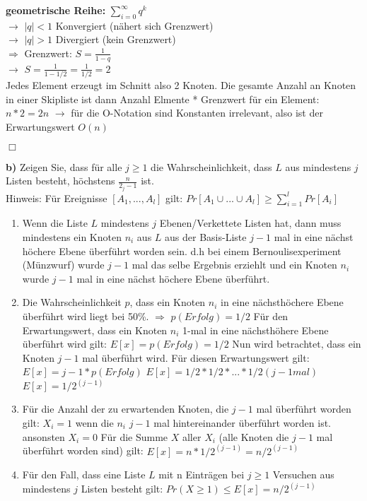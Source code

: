 \textbf{geometrische Reihe:} $\sum_{i=0}^{\infty} q^k$\\
$\rightarrow$ $|q| < 1$ Konvergiert (nähert sich Grenzwert)\\
$\rightarrow$ $|q| > 1$ Divergiert (kein Grenzwert)\\
$\Rightarrow$ Grenzwert: $S= \frac{1}{1-q}$\\
$\rightarrow$ $S= \frac{1}{1-1/2} = \frac{1}{1/2} = 2$\\

Jedes Element erzeugt im Schnitt also 2 Knoten. Die gesamte Anzahl an Knoten in einer Skipliste ist dann Anzahl Elmente * Grenzwert für ein Element:\\
$n * 2 = 2n$ $\rightarrow$ für die O-Notation sind Konstanten irrelevant, also ist der Erwartungswert $O(n)$

\begin{flushright}
$\Box$
\end{flushright}


\newpage
\noindent
\textbf{b)} Zeigen Sie, dass für alle $j \geq 1$ die Wahrscheinlichkeit, dass $L$ aus mindestens $j$ Listen besteht, höchstens $\frac{n}{2_j-1}$ ist.\\
Hinweis: Für Ereignisse $[A_1,..., A_l]$ gilt: $Pr[A_{1} \cup ... \cup A_{l}] \geq \sum_{i=1}^{l}Pr[A_i]$\\
 
\begin{enumerate}
\item Wenn die Liste $L$ mindestens $j$ Ebenen/Verkettete Listen hat, dann muss mindestens ein Knoten $n_i$ aus $L$ aus der Basis-Liste $j-1$ mal in eine nächst höchere Ebene überführt worden sein.
   d.h bei einem Bernoulisexperiment (Münzwurf) wurde $j-1$ mal das selbe Ergebnis erziehlt und ein Knoten $n_i$ wurde $j-1$ mal in eine nächst höchere Ebene überführt.
\item Die Wahrscheinlichkeit $p$, dass ein Knoten $n_i$ in eine nächsthöchere Ebene überführt wird liegt bei 50\%. $\Rightarrow$ $p(Erfolg) = 1/2$
   Für den Erwartungswert, dass ein Knoten $n_i$ 1-mal in eine nächsthöhere Ebene überführt wird gilt: $E[x] = p(Erfolg) = 1/2$
   Nun wird betrachtet, dass ein Knoten $j-1$ mal überführt wird. Für diesen Erwartungswert gilt: $E[x] = j-1*p(Erfolg)$
   $E[x] = 1/2 * 1/2 * ... * 1/2 (j-1 mal)$
   $E[x] = 1/2^(j-1)$
\item Für die Anzahl der zu erwartenden Knoten, die $j-1$ mal überführt worden gilt:
   $X_i = 1$ wenn die $n_i$ $j-1$ mal hintereinander überführt worden ist. ansonsten $X_i = 0$
   Für die Summe $X$ aller $X_i$ (alle Knoten die $j-1$ mal überführt worden sind) gilt: $E[x] = n*1/2^(j-1) = n/2^(j-1)$
\item Für den Fall, dass eine Liste $L$ mit n Einträgen bei $j \geq 1$ Versuchen aus mindestens $j$ Listen besteht gilt: 
   $Pr(X \geq 1) \leq E[x] = n/2^(j-1)$
\end{enumerate}







